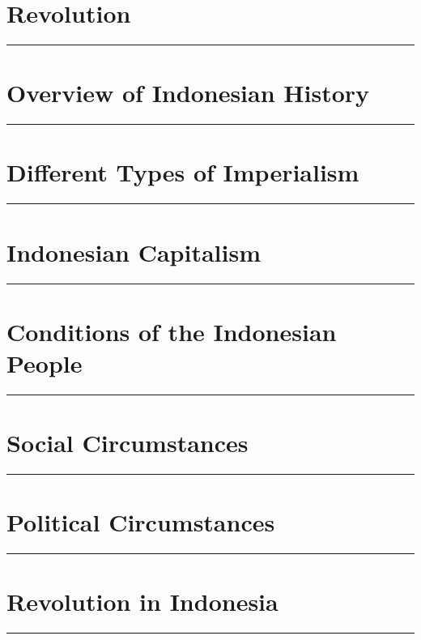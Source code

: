 \documentclass[12pt, oneside, a4paper]{memoir}
\begin{document}
    \chapter{\centering Revolution}
    \hrule
    \vspace*{1cm}
    

    \chapter{\centering Overview of Indonesian History}
    \hrule
    \vspace*{1cm}
    

    \chapter{\centering Different Types of Imperialism}
    \hrule
    \vspace*{1cm}
    

    \chapter{\centering Indonesian Capitalism}
    \hrule
    \vspace*{1cm}
    

    \chapter{\centering Conditions of the Indonesian People}
    \hrule
    \vspace*{1cm}
    

    \chapter{\centering Social Circumstances}
    \hrule
    \vspace*{1cm}
    

    \chapter{\centering Political Circumstances}
    \hrule
    \vspace*{1cm}
    

    \chapter{\centering Revolution in Indonesia}
    \hrule
    \vspace*{1cm}
    
\end{document}

